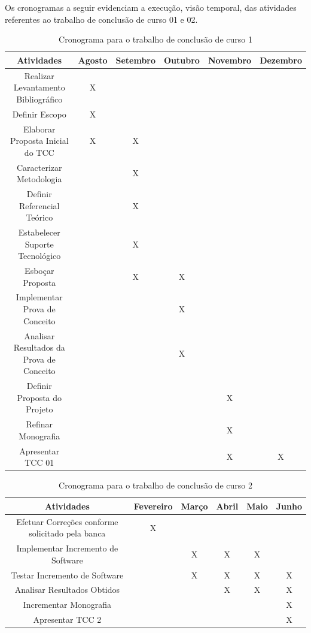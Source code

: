 	Os cronogramas a seguir evidenciam a execução, visão temporal, das atividades referentes ao trabalho de conclusão de curso 01 e 02. 
	  
\begin{table}[h]
  \tiny
  \centering
  \caption{Cronograma para o trabalho de conclusão de curso 1}
  \label{cronograma-tcc-1}
  \begin{tabular}{| c | c | c | c | c | c |}
    \hline
    Atividades & Agosto & Setembro & Outubro & Novembro & Dezembro \\ \hline
    Realizar Levantamento Bibliográfico & X &  &  &  &  \\
    Definir Escopo & X &  &  &  &  \\
    Elaborar Proposta Inicial do TCC & X & X &  &  &  \\
    Caracterizar Metodologia &  & X &  &  &  \\
    Definir Referencial Teórico &  & X &  &  &  \\
    Estabelecer Suporte Tecnológico &  & X &  &  &  \\
    Esboçar Proposta &  & X & X &  &  \\
    Implementar Prova de Conceito &  &  & X &  &  \\
    Analisar Resultados da Prova de Conceito &  &  & X &  &  \\
    Definir Proposta do Projeto &  &  &  & X &  \\
    Refinar Monografia &  &  &  & X &  \\
    Apresentar TCC 01 &  &  &  & X & X \\ \hline
  \end{tabular}
\end{table}
  
\begin{table}[h]
  \tiny
  \centering
  \caption{Cronograma para o trabalho de conclusão de curso 2}
  \label{cronograma-tcc-2}
  \begin{tabular}{| c | c | c | c | c | c |}
  \hline
    Atividades & Fevereiro & Março & Abril & Maio & Junho \\ \hline
    Efetuar Correções conforme solicitado pela banca & X &  &  &  &  \\
    Implementar Incremento de Software &  & X & X & X &  \\
    Testar Incremento de Software &  & X & X & X & X \\
    Analisar Resultados Obtidos &  &  & X & X & X \\
    Incrementar Monografia &  &  &  &  & X \\
    Apresentar TCC 2 &  &  &  &  & X \\ \hline
  \end{tabular}
\end{table}
  
